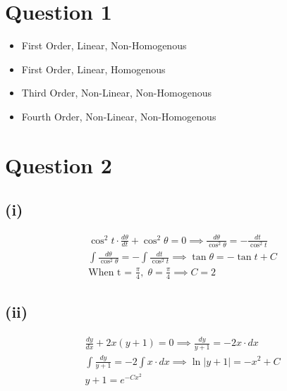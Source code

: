 \documentclass[12pt, a4paper]{article}
\begin{document}
\section{Question 1}
\begin{itemize}
  \item First Order, Linear, Non-Homogenous
  \item First Order, Linear, Homogenous
  \item Third Order, Non-Linear, Non-Homogenous
  \item Fourth Order, Non-Linear, Non-Homogenous
\end{itemize}

\section{Question 2}
\subsection{(i)}
\begin{gather*}
  \cos^2 t \cdot \frac{d \theta }{ dt } + \cos^2 \theta = 0 \implies
  \frac{d \theta}{\cos^2 \theta} = -\frac{dt}{\cos^2 t} \\[5pt]
  \int \frac{d \theta}{\cos^2 \theta} = -\int \frac{dt}{\cos^2 t} \implies 
  \tan \theta = -\tan t + C \\[5pt]
  \text{When t = } \frac{\pi}{4}, \; \theta = \frac{\pi}{4} \implies C = 2
\end{gather*}

\subsection{(ii)}
\begin{gather*}
  \frac{dy}{dx} + 2x(y + 1) = 0 \implies
  \frac{dy}{y + 1} = -2x \cdot dx \\[5pt]
  \int \frac{dy}{y + 1} = -2 \int x \cdot dx \implies
  \ln |y + 1| = -x^2 + C \\[5pt]
  y + 1 = e^{-Cx^2} 
\end{gather*}
\end{document}
